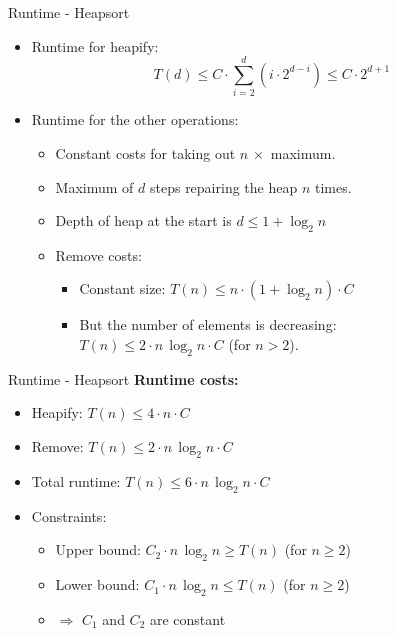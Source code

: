 \begin{frame}{Runtime - Heapsort}
  \begin{itemize}
    \item
      Runtime for heapify:
      \[\displaystyle
      T(d) \leq C \cdot \sum \limits^d_{i=2} \left(i \cdot 2^{d-i} \right)
      \leq C \cdot 2^{d + 1}\]
    \item
      Runtime for the other operations:
      \begin{itemize}
        \item
          Constant costs for taking out $n \, \times$ maximum.
        \item
          Maximum of $d$ steps repairing the heap $n$ times.
        \item
          Depth of heap at the start is $d \leq 1 + \log_2 n$
        \item
          Remove costs:
          \begin{itemize}
            \item
              Constant size:
              $T(n) \leq n \cdot (1 +\log_2 n) \cdot C$
            \item
              But the number of elements is decreasing:\\
              $T(n) \leq 2 \cdot n  \, \log_2 n \cdot C$ (for $n > 2$).
          \end{itemize}
      \end{itemize}
  \end{itemize}
\end{frame}


\begin{frame}{Runtime - Heapsort}
  \textbf{Runtime costs:}
  \begin{itemize}
    \item
      Heapify: $T(n) \leq 4 \cdot n \cdot C$
    \item
      Remove: $T(n) \leq 2 \cdot n \, \log_2 n \cdot C$
    \item
      Total runtime: $T(n) \leq 6 \cdot n \, \log_2 n \cdot C$
    \item
      Constraints:
      \begin{itemize}
        \item
          Upper bound:
          $C_2 \cdot n \, \log_2 n \geq T(n)$ (for $n \geq 2$)
        \item
          Lower bound:
          $C_1 \cdot n \, \log_2 n \leq T(n)$ (for $n \geq 2$)
        \item
          $\Rightarrow$ $C_1$ and $C_2$ are constant
      \end{itemize}
  \end{itemize}
\end{frame}